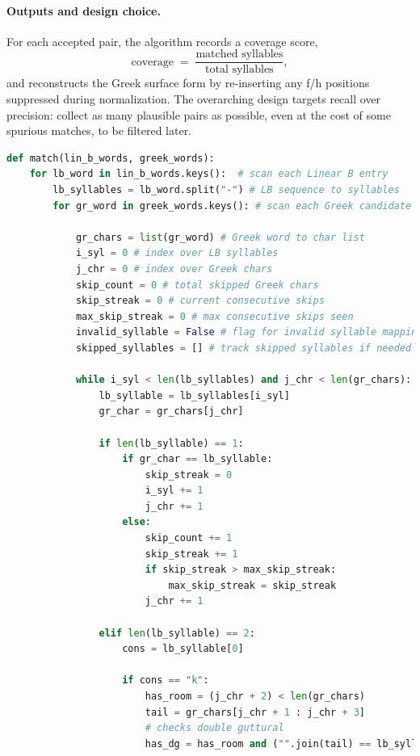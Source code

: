 \paragraph{Outputs and design choice.}
For each accepted pair, the algorithm records a coverage score,
\[
\text{coverage} \;=\; \frac{\text{matched syllables}}{\text{total syllables}},
\]
and reconstructs the Greek surface form by re-inserting any f/h positions suppressed during normalization.
The overarching design targets recall over precision: collect as many plausible pairs as possible, even at the cost of some spurious matches, to be filtered later.

\begin{lstlisting}[language=Python, caption=Brute-Force matching algorithm, breaklines=true, postbreak=\mbox{\hspace{50pt}\textcolor{red}{$\hookrightarrow$}\space}]
def match(lin_b_words, greek_words):
    for lb_word in lin_b_words.keys():  # scan each Linear B entry
        lb_syllables = lb_word.split("-") # LB sequence to syllables
        for gr_word in greek_words.keys(): # scan each Greek candidate

            gr_chars = list(gr_word) # Greek word to char list
            i_syl = 0 # index over LB syllables
            j_chr = 0 # index over Greek chars
            skip_count = 0 # total skipped Greek chars
            skip_streak = 0 # current consecutive skips
            max_skip_streak = 0 # max consecutive skips seen
            invalid_syllable = False # flag for invalid syllable mapping
            skipped_syllables = [] # track skipped syllables if needed

            while i_syl < len(lb_syllables) and j_chr < len(gr_chars):
                lb_syllable = lb_syllables[i_syl]
                gr_char = gr_chars[j_chr]

                if len(lb_syllable) == 1:
                    if gr_char == lb_syllable:
                        skip_streak = 0
                        i_syl += 1
                        j_chr += 1
                    else:
                        skip_count += 1
                        skip_streak += 1
                        if skip_streak > max_skip_streak:
                            max_skip_streak = skip_streak
                        j_chr += 1

                elif len(lb_syllable) == 2:
                    cons = lb_syllable[0]

                    if cons == "k":
                        has_room = (j_chr + 2) < len(gr_chars)
                        tail = gr_chars[j_chr + 1 : j_chr + 3]
                        # checks double guttural
                        has_dg = has_room and ("".join(tail) == lb_syllable)


\end{lstlisting}
